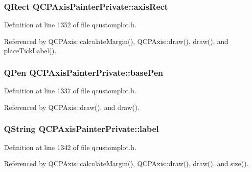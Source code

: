 \subsubsection[{axis\+Rect}]{\setlength{\rightskip}{0pt plus 5cm}Q\+Rect Q\+C\+P\+Axis\+Painter\+Private\+::axis\+Rect}\label{class_q_c_p_axis_painter_private_afcd55b0e1ecd689fffd2b1fc75dc7732}


Definition at line 1352 of file qcustomplot.\+h.



Referenced by Q\+C\+P\+Axis\+::calculate\+Margin(), Q\+C\+P\+Axis\+::draw(), draw(), and place\+Tick\+Label().

\hypertarget{class_q_c_p_axis_painter_private_ab4affb27ae3485fecb7466622cabcbb2}{}
\subsubsection[{base\+Pen}]{\setlength{\rightskip}{0pt plus 5cm}Q\+Pen Q\+C\+P\+Axis\+Painter\+Private\+::base\+Pen}\label{class_q_c_p_axis_painter_private_ab4affb27ae3485fecb7466622cabcbb2}


Definition at line 1337 of file qcustomplot.\+h.



Referenced by Q\+C\+P\+Axis\+::draw(), and draw().

\hypertarget{class_q_c_p_axis_painter_private_afe004c322f92543c0467afc02da6cf6d}{}
\subsubsection[{label}]{\setlength{\rightskip}{0pt plus 5cm}Q\+String Q\+C\+P\+Axis\+Painter\+Private\+::label}\label{class_q_c_p_axis_painter_private_afe004c322f92543c0467afc02da6cf6d}


Definition at line 1342 of file qcustomplot.\+h.



Referenced by Q\+C\+P\+Axis\+::calculate\+Margin(), Q\+C\+P\+Axis\+::draw(), draw(), and size().

\hypertarget{class_q_c_p_axis_painter_private_a5c36467daf057da0cf0792f3c5a06089}{}
